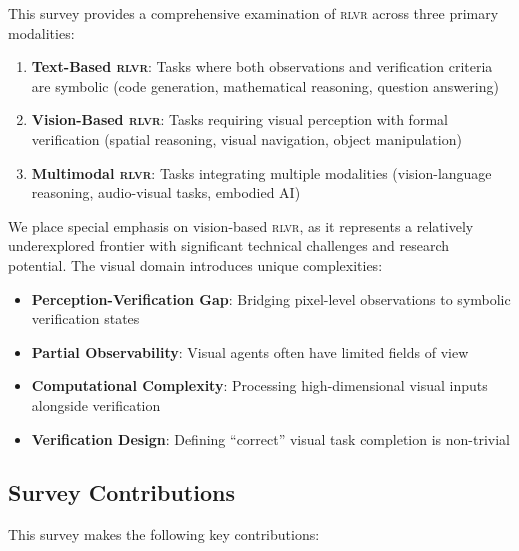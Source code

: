 \documentclass[11pt,a4paper]{article}
\newcommand{\rlvr}{\textsc{rlvr}}
\begin{document}
This survey provides a comprehensive examination of \rlvr{} across three primary modalities:

\begin{enumerate}[leftmargin=*]
    \item \textbf{Text-Based \rlvr{}}: Tasks where both observations and verification criteria are symbolic (code generation, mathematical reasoning, question answering)
    \item \textbf{Vision-Based \rlvr{}}: Tasks requiring visual perception with formal verification (spatial reasoning, visual navigation, object manipulation)
    \item \textbf{Multimodal \rlvr{}}: Tasks integrating multiple modalities (vision-language reasoning, audio-visual tasks, embodied AI)
\end{enumerate}

We place special emphasis on vision-based \rlvr{}, as it represents a relatively underexplored frontier with significant technical challenges and research potential. The visual domain introduces unique complexities:

\begin{itemize}[leftmargin=*]
    \item \textbf{Perception-Verification Gap}: Bridging pixel-level observations to symbolic verification states
    \item \textbf{Partial Observability}: Visual agents often have limited fields of view
    \item \textbf{Computational Complexity}: Processing high-dimensional visual inputs alongside verification
    \item \textbf{Verification Design}: Defining ``correct'' visual task completion is non-trivial
\end{itemize}

\subsection{Survey Contributions}
\label{sec:contributions}

This survey makes the following key contributions:
\end{document}
